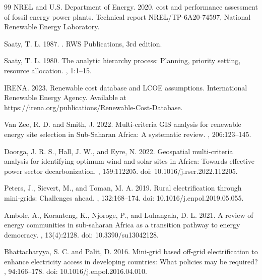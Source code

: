 \documentclass[12pt,a4paper]{article}
\begin{document}
\begin{thebibliography}{99}
NREL and U.S. Department of Energy. 2020.
 cost and performance assessment of fossil energy power plants.
\newblock Technical report NREL/TP-6A20-74597, National Renewable Energy Laboratory.

Saaty, T. L. 1987.
.
\newblock RWS Publications, 3rd edition.

Saaty, T. L. 1980.
\newblock The analytic hierarchy process: {P}lanning, priority setting, resource allocation.
, 1:1--15.

IRENA. 2023.
\newblock Renewable cost database and {LCOE} assumptions.
\newblock International Renewable Energy Agency.
\newblock Available at https://irena.org/publications/Renewable-Cost-Database.

Van Zee, R. D. and Smith, J. 2022.
\newblock Multi-criteria {GIS} analysis for renewable energy site selection in {S}ub-{S}aharan {A}frica: {A} systematic review.
, 206:123--145.

Doorga, J. R. S., Hall, J. W., and Eyre, N. 2022.
\newblock Geospatial multi-criteria analysis for identifying optimum wind and solar sites in {A}frica: {T}owards effective power sector decarbonization.
, 159:112205.
\newblock doi: 10.1016/j.rser.2022.112205.

Peters, J., Sievert, M., and Toman, M. A. 2019.
\newblock Rural electrification through mini-grids: {C}hallenges ahead.
, 132:168--174.
\newblock doi: 10.1016/j.enpol.2019.05.055.

Ambole, A., Koranteng, K., Njoroge, P., and Luhangala, D. L. 2021.
\newblock A review of energy communities in sub-saharan {A}frica as a transition pathway to energy democracy.
, 13(4):2128.
\newblock doi: 10.3390/su13042128.

Bhattacharyya, S. C. and Palit, D. 2016.
\newblock Mini-grid based off-grid electrification to enhance electricity access in developing countries: {W}hat policies may be required?
, 94:166--178.
\newblock doi: 10.1016/j.enpol.2016.04.010.


\end{thebibliography}
\end{document}
